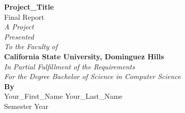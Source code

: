 \doublespacing
{}
\begin{titlepage}
    \begin{center}
        \vspace*{2in}
        {\Large \textbf{Project\_Title}}\\[0.2cm]
        {\Large Final Report}\\[0.2cm]
        \textit{A Project}\\[0.2cm]
        \textit{Presented}\\[0.2cm]
        \textit{To the Faculty of}\\[0.2cm]
        \textbf{California State University, Dominguez Hills}\\[0.2cm]
        \textit{In Partial Fulfillment of the Requirements}\\[0.2cm]
        \textit{For the Degree Bachelor of Science in Computer Science}\\[2cm]
        \textbf{By}\\[0.2cm]
        Your\_First\_Name Your\_Last\_Name\\[0.2cm]
        Semester Year
    \end{center}
\end{titlepage}

\setcounter{page}{2} %